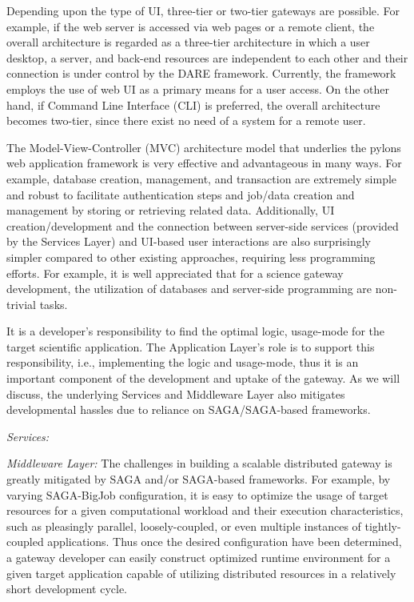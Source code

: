 \documentclass[]{article}
\begin{document}
Depending upon the type of UI, three-tier or two-tier gateways are
possible.  For example, if the web server is accessed via web pages or
a remote client, the overall architecture is regarded as a three-tier
architecture in which a user desktop, a server, and back-end resources
are independent to each other and their connection is under control by
the DARE framework.  Currently, the framework employs the use of web
UI as a primary means for a user access.  On the other hand, if
Command Line Interface (CLI) is preferred, the overall architecture
becomes two-tier, since there exist no need of a system for a remote
user.  %

The Model-View-Controller (MVC) architecture model that underlies the
pylons web application framework\cite{pylonsurl} is very effective and advantageous in
many ways. For example, database creation, management, and transaction
are extremely simple and robust to facilitate authentication steps and
job/data creation and management by storing or retrieving related
data.  Additionally, UI creation/development and the connection
between server-side services (provided by the Services Layer) and
UI-based user interactions are also surprisingly simpler compared to
other existing approaches, requiring less programming efforts.  For
example, it is well appreciated that for a science gateway
development, the utilization of databases and server-side programming
are non-trivial tasks.

It is a developer's responsibility to find the optimal logic,
usage-mode for the target scientific application.  The Application
Layer's role is to support this responsibility, i.e., implementing the
logic and usage-mode, thus it is an important component of the
development and uptake of the gateway. As we will discuss, the
underlying Services and Middleware Layer also mitigates developmental
hassles due to reliance on SAGA/SAGA-based frameworks.


\textit{Services:}

\textit{Middleware Layer:} The challenges in building a scalable
distributed gateway is greatly mitigated by SAGA and/or SAGA-based
frameworks.  For example, by varying SAGA-BigJob configuration, it is
easy to optimize the usage of target resources for a given
computational workload and their execution characteristics, such as
pleasingly parallel, loosely-coupled, or even multiple instances of
tightly-coupled applications.  Thus once the desired configuration
have been determined, a gateway developer can easily construct
optimized runtime environment for a given target application capable
of utilizing distributed resources in a relatively short development
cycle.
\end{document}
